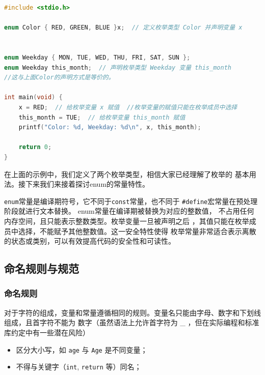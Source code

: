 \begin{enumerate}[label={(\arabic*)}]
\begin{lstlisting}[language=C,caption={使用 enum 定义变量},label={lst:enum var}]
#include <stdio.h>

enum Color { RED, GREEN, BLUE }x;  // 定义枚举类型 Color 并声明变量 x


enum Weekday { MON, TUE, WED, THU, FRI, SAT, SUN };
enum Weekday this_month;  // 声明枚举类型 Weekday 变量 this_month
//这与上面Color的声明方式是等价的。

int main(void) {
    x = RED;  // 给枚举变量 x 赋值  //枚举变量的赋值只能在枚举成员中选择
    this_month = TUE;  // 给枚举变量 this_month 赋值
    printf("Color: %d, Weekday: %d\n", x, this_month);

    return 0;
}
\end{lstlisting}

在上面的示例中，我们定义了两个枚举类型，相信大家已经理解了枚举的
基本用法。接下来我们来接着探讨enum的常量特性。

\texttt{enum}常量是编译期符号，它不同于\texttt{const}常量，也不同于
\texttt{\#define}宏常量在预处理阶段就进行文本替换。
enum常量在编译期被替换为对应的整数值，
不占用任何内存空间，且只能表示整数类型。枚举变量一旦被声明之后
，其值只能在枚举成员中选择，不能赋予其他整数值。这一安全特性使得
枚举常量非常适合表示离散的状态或类别，可以有效提高代码的安全性和可读性。

\end{enumerate}





























\noindent%
\subsection{命名规则与规范}
\subsubsection{命名规则}
对于字符的组成，变量和常量遵循相同的规则。变量名只能由字母、数字和下划线组成，且首字符不能为
    数字（虽然语法上允许首字符为 \_ ，但在实际编程和标准库约定中有一些潜在风险）
\begin{itemize}
    \item 区分大小写，如 \texttt{age} 与 \texttt{Age} 是不同变量；
    \item 不得与关键字（\texttt{int}, \texttt{return} 等）同名；
\end{itemize}
